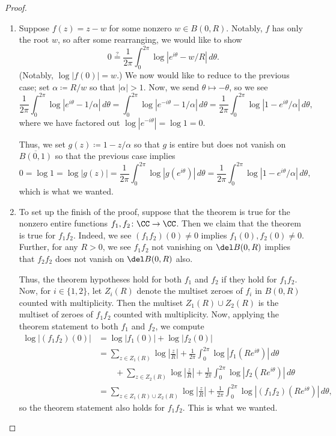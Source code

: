 \documentclass[notes.tex]{subfiles}
\begin{document}
\begin{proof}
\begin{enumerate}
		\item Suppose $f(z)=z-w$ for some nonzero $w\in B(0,R)$. Notably, $f$ has only the root $w$, so after some rearranging, we would like to show
		\[0\stackrel?=\frac1{2\pi}\int_0^{2\pi}\log\left|e^{i\theta}-w/R\right|\,d\theta.\]
		(Notably, $\log|f(0)|=w$.) We now would like to reduce to the previous case; set $\alpha\coloneqq R/w$ so that $|\alpha|>1$. Now, we send $\theta\mapsto-\theta$, so we see
		\[\frac1{2\pi}\int_0^{2\pi}\log\left|e^{i\theta}-1/\alpha\right|\,d\theta=\int_0^{2\pi}\log\left|e^{-i\theta}-1/\alpha\right|\,d\theta=\frac1{2\pi}\int_0^{2\pi}\log\left|1-e^{i\theta}/\alpha\right|\,d\theta,\]
		where we have factored out $\log\left|e^{-i\theta}\right|=\log1=0$.

		Thus, we set $g(z)\coloneqq 1-z/\alpha$ so that $g$ is entire but does not vanish on $\overline{B(0,1)}$ so that the previous case implies
		\[0=\log1=\log|g(z)|=\frac1{2\pi}\int_0^{2\pi}\log\left|g\left(e^{i\theta}\right)\right|\,d\theta=\frac1{2\pi}\int_0^{2\pi}\log\left|1-e^{i\theta}/\alpha\right|\,d\theta,\]
		which is what we wanted.

		\item To set up the finish of the proof, suppose that the theorem is true for the nonzero entire functions $f_1,f_2\colon\CC\to\CC$. Then we claim that the theorem is true for $f_1f_2$. Indeed, we see $(f_1f_2)(0)\ne0$ implies $f_1(0),f_2(0)\ne0$. Further, for any $R>0$, we see $f_1f_2$ not vanishing on $\del B(0,R)$ implies that $f_2f_2$ does not vanish on $\del B(0,R)$ also.

		Thus, the theorem hypotheses hold for both $f_1$ and $f_2$ if they hold for $f_1f_2$. Now, for $i\in\{1,2\}$, let $Z_i(R)$ denote the multiset zeroes of $f_i$ in $B(0,R)$ counted with multiplicity. Then the multiset $Z_1(R)\cup Z_2(R)$ is the multiset of zeroes of $f_1f_2$ counted with multiplicity. Now, applying the theorem statement to both $f_1$ and $f_2$, we compute
		\begin{align*}
			\log|(f_1f_2)(0)| &= \log|f_1(0)|+\log|f_2(0)| \\
			&= \sum_{z\in Z_1(R)}\log\left|\frac zR\right|+\frac1{2\pi}\int_0^{2\pi}\log\left|f_1\left(Re^{i\theta}\right)\right|\,d\theta \\
			&\qquad+\sum_{z\in Z_2(R)}\log\left|\frac zR\right|+\frac1{2\pi}\int_0^{2\pi}\log\left|f_2\left(Re^{i\theta}\right)\right|\,d\theta \\
			&= \sum_{z\in Z_1(R)\cup Z_2(R)}\log\left|\frac zR\right|+\frac1{2\pi}\int_0^{2\pi}\log\left|(f_1f_2)\left(Re^{i\theta}\right)\right|\,d\theta,
		\end{align*}
		so the theorem statement also holds for $f_1f_2$. This is what we wanted.


\end{enumerate}
\end{proof}
\end{document}
